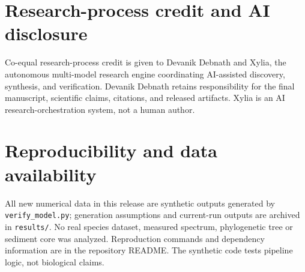 \documentclass[11pt,a4paper]{article}
\begin{document}
\section*{Research-process credit and AI disclosure}
Co-equal research-process credit is given to Devanik Debnath and Xylia, the autonomous multi-model research engine coordinating AI-assisted discovery, synthesis, and verification. Devanik Debnath retains responsibility for the final manuscript, scientific claims, citations, and released artifacts. Xylia is an AI research-orchestration system, not a human author.

\section*{Reproducibility and data availability}
All new numerical data in this release are synthetic outputs generated by \texttt{verify\_model.py}; generation assumptions and current-run outputs are archived in \texttt{results/}. No real species dataset, measured spectrum, phylogenetic tree or sediment core was analyzed. Reproduction commands and dependency information are in the repository README. The synthetic code tests pipeline logic, not biological claims.

\printbibliography[title={References}]
\end{document}
